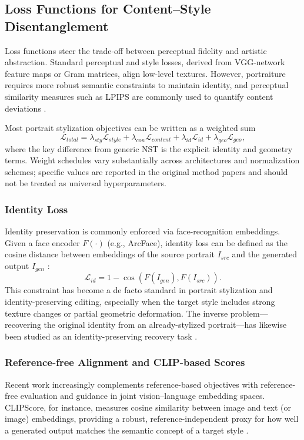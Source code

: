 \documentclass[journal]{IEEEtran}
\begin{document}
\subsection{Loss Functions for Content--Style Disentanglement}
\label{sec:theory:losses}
Loss functions steer the trade-off between perceptual fidelity and artistic abstraction. Standard perceptual and style losses, derived from VGG-network feature maps or Gram matrices, align low-level textures. However, portraiture requires more robust semantic constraints to maintain identity, and perceptual similarity measures such as LPIPS are commonly used to quantify content deviations \cite{zhang2018lpips}.

Most portrait stylization objectives can be written as a weighted sum
\begin{equation}
  \mathcal{L}_{total} = \lambda_{sty}\mathcal{L}_{style} + \lambda_{con}\mathcal{L}_{content} + \lambda_{id}\mathcal{L}_{id} + \lambda_{geo}\mathcal{L}_{geo},
\end{equation}
where the key difference from generic NST is the explicit identity and geometry terms. Weight schedules vary substantially across architectures and normalization schemes; specific values are reported in the original method papers \cite{gatys2016image,johnson2016perceptual,huang2017arbitraryst,yang2022dualstylegan,sain2023styleface} and should not be treated as universal hyperparameters.

\subsubsection{Identity Loss}
Identity preservation is commonly enforced via face-recognition embeddings. Given a face encoder $F(\cdot)$ (e.g., ArcFace), identity loss can be defined as the cosine distance between embeddings of the source portrait $I_{src}$ and the generated output $I_{gen}$ \cite{deng2019arcface}:
\begin{equation}
  \mathcal{L}_{id} = 1 - \cos(F(I_{gen}), F(I_{src})).
\end{equation}
This constraint has become a de facto standard in portrait stylization and identity-preserving editing, especially when the target style includes strong texture changes or partial geometric deformation. The inverse problem---recovering the original identity from an already-stylized portrait---has likewise been studied as an identity-preserving recovery task \cite{shiri2019identitypreservingfacerecoverystylized}.

\subsubsection{Reference-free Alignment and CLIP-based Scores}
Recent work increasingly complements reference-based objectives with reference-free evaluation and guidance in joint vision--language embedding spaces. CLIPScore, for instance, measures cosine similarity between image and text (or image) embeddings, providing a robust, reference-independent proxy for how well a generated output matches the semantic concept of a target style \cite{hessel2022clipscore}.
\end{document}
